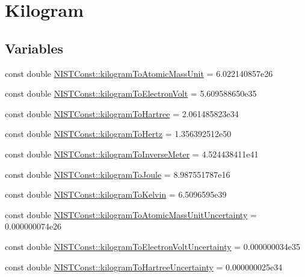 \hypertarget{group___n_i_s_t_const-_kilogram}{}\section{Kilogram}
\label{group___n_i_s_t_const-_kilogram}
\subsection*{Variables}
\begin{DoxyCompactItemize}
\item 
const double \hyperlink{group___n_i_s_t_const-_kilogram_gaa6a5187e436c3ce769319ad4968d53ff}{N\+I\+S\+T\+Const\+::kilogram\+To\+Atomic\+Mass\+Unit} = 6.\+022140857e26
\item 
const double \hyperlink{group___n_i_s_t_const-_kilogram_gae0d25d28f6a0596f2dd5f8b3dc5ebb38}{N\+I\+S\+T\+Const\+::kilogram\+To\+Electron\+Volt} = 5.\+609588650e35
\item 
const double \hyperlink{group___n_i_s_t_const-_kilogram_gaa1f73e0db10cccf2a4c86dbd360e49a8}{N\+I\+S\+T\+Const\+::kilogram\+To\+Hartree} = 2.\+061485823e34
\item 
const double \hyperlink{group___n_i_s_t_const-_kilogram_gaf543ce948a71df1884a8f240106c3c33}{N\+I\+S\+T\+Const\+::kilogram\+To\+Hertz} = 1.\+356392512e50
\item 
const double \hyperlink{group___n_i_s_t_const-_kilogram_gaeb262618c1568d210f8a5a8fdca39ae2}{N\+I\+S\+T\+Const\+::kilogram\+To\+Inverse\+Meter} = 4.\+524438411e41
\item 
const double \hyperlink{group___n_i_s_t_const-_kilogram_gaf3635d5c9747ebcd2edadf77388fea9b}{N\+I\+S\+T\+Const\+::kilogram\+To\+Joule} = 8.\+987551787e16
\item 
const double \hyperlink{group___n_i_s_t_const-_kilogram_ga79d71b550888761f76eaca5ffc4a29cb}{N\+I\+S\+T\+Const\+::kilogram\+To\+Kelvin} = 6.\+5096595e39
\item 
const double \hyperlink{group___n_i_s_t_const-_kilogram_ga0a840aeb3ea862ed078ead0caf886dfb}{N\+I\+S\+T\+Const\+::kilogram\+To\+Atomic\+Mass\+Unit\+Uncertainty} = 0.\+000000074e26
\item 
const double \hyperlink{group___n_i_s_t_const-_kilogram_ga1bc5e8f6c0c532f454e143a589a532dc}{N\+I\+S\+T\+Const\+::kilogram\+To\+Electron\+Volt\+Uncertainty} = 0.\+000000034e35
\item 
const double \hyperlink{group___n_i_s_t_const-_kilogram_ga62cf42463d1d0306ae8656649434be2b}{N\+I\+S\+T\+Const\+::kilogram\+To\+Hartree\+Uncertainty} = 0.\+000000025e34

\end{DoxyCompactItemize}
